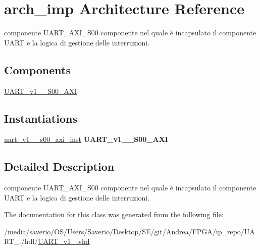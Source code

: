 \hypertarget{classUART__v1__0_1_1arch__imp}{}\section{arch\+\_\+imp Architecture Reference}
\label{classUART__v1__0_1_1arch__imp}


componente U\+A\+R\+T\+\_\+\+A\+X\+I\+\_\+\+S00  componente nel quale è incapsulato il componente U\+A\+RT e la logica di gestione delle interruzioni.  


\subsection*{Components}
 \begin{DoxyCompactItemize}
\item 
\mbox{\label{classUART__v1__0_1_1arch__imp_a554bf35242758ea2c6cdb41b3a146b89}} 
\hyperlink{classUART__v1__0_1_1arch__imp_a554bf35242758ea2c6cdb41b3a146b89}{U\+A\+R\+T\+\_\+v1\+\_\+\_\+\+S00\+\_\+\+A\+XI}  {\bfseries }  
\end{DoxyCompactItemize}
\subsection*{Instantiations}
 \begin{DoxyCompactItemize}
\item 
\mbox{\label{classUART__v1__0_1_1arch__imp_af8995827bb89a3b54bf57d79330e4cf5}} 
\hyperlink{classUART__v1__0_1_1arch__imp_af8995827bb89a3b54bf57d79330e4cf5}{uart\+\_\+v1\+\_\+\_\+s00\+\_\+axi\+\_\+inst}  {\bfseries U\+A\+R\+T\+\_\+v1\+\_\+\_\+\+S00\+\_\+\+A\+XI}   
\end{DoxyCompactItemize}


\subsection{Detailed Description}
componente U\+A\+R\+T\+\_\+\+A\+X\+I\+\_\+\+S00  componente nel quale è incapsulato il componente U\+A\+RT e la logica di gestione delle interruzioni. 

The documentation for this class was generated from the following file\+:\begin{DoxyCompactItemize}
\item 
/media/saverio/\+O\+S/\+Users/\+Saverio/\+Desktop/\+S\+E/git/\+Andrea/\+F\+P\+G\+A/ip\+\_\+repo/\+U\+A\+R\+T\+\_./hdl/\hyperlink{UART__v1__0_8vhd}{U\+A\+R\+T\+\_\+v1\+\_.\+vhd}\end{DoxyCompactItemize}
